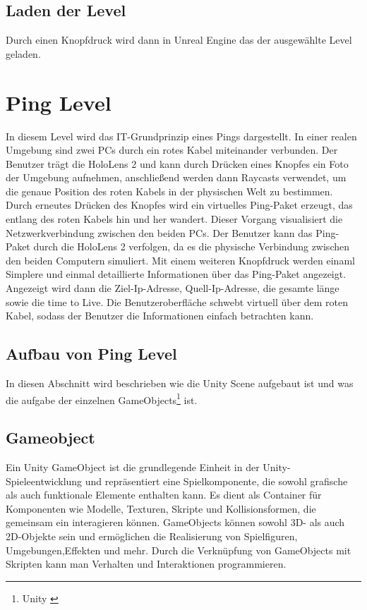 \subsection{Laden der Level}
Durch einen Knopfdruck wird dann in Unreal Engine das der ausgewählte
Level geladen.

\section{Ping Level}
In diesem Level wird das IT-Grundprinzip eines Pings dargestellt.
In einer realen Umgebung sind zwei PCs durch ein
rotes Kabel miteinander verbunden. Der Benutzer trägt die
HoloLens 2 und kann durch Drücken eines Knopfes ein Foto der Umgebung
aufnehmen, anschließend werden dann Raycasts verwendet,
um die genaue Position des roten Kabels in der physischen
Welt zu bestimmen. Durch erneutes Drücken des Knopfes wird
ein virtuelles Ping-Paket erzeugt, das entlang des roten
Kabels hin und her wandert. Dieser Vorgang visualisiert
die Netzwerkverbindung zwischen den beiden PCs.
Der Benutzer kann das Ping-Paket durch die HoloLens 2 verfolgen,
da es die physische Verbindung zwischen den beiden Computern
simuliert. Mit einem weiteren Knopfdruck werden einaml Simplere
und einmal detaillierte Informationen über das Ping-Paket angezeigt.
Angezeigt wird dann die Ziel-Ip-Adresse, Quell-Ip-Adresse, die gesamte länge
 sowie die time to Live. Die Benutzeroberfläche
schwebt virtuell über dem roten Kabel, sodass der Benutzer
die Informationen einfach betrachten kann.

\clearpage

\subsection{Aufbau von Ping Level}
In diesen Abschnitt wird beschrieben wie die Unity Scene aufgebaut ist und
was die aufgabe der einzelnen GameObjects\footnote{Unity \cite{GameObject}} ist.

\subsection{Gameobject}
Ein Unity GameObject ist die grundlegende Einheit in der Unity-Spieleentwicklung
und repräsentiert eine Spielkomponente, die sowohl grafische als auch funktionale
Elemente enthalten kann. Es dient als Container für Komponenten wie Modelle,
Texturen, Skripte und Kollisionsformen, die gemeinsam ein interagieren können.
GameObjects können sowohl 3D- als auch 2D-Objekte sein und ermöglichen die
Realisierung von Spielfiguren, Umgebungen,Effekten und mehr. Durch die
Verknüpfung von GameObjects mit Skripten kann man Verhalten und
Interaktionen programmieren.

